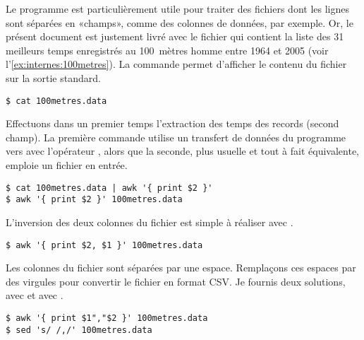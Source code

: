 Le programme  est particulièrement utile pour traiter des
fichiers dont les lignes sont séparées en «champs», comme des colonnes
de données, par exemple. Or, le présent document est justement livré
avec le fichier  qui contient la liste des 31
meilleurs temps enregistrés au 100~mètres homme entre 1964 et 2005
(voir l'\autoref{ex:internes:100metres}). La commande 
permet d'afficher le contenu du fichier sur la sortie standard.
\begin{Schunk}
\begin{Verbatim}
$ cat 100metres.data
\end{Verbatim}
\end{Schunk}

Effectuons dans un premier temps l'extraction des temps des records
(second champ). La première commande utilise un transfert de données
du programme  vers  avec l'opérateur %
\code{\textbar}, alors
que la seconde, plus usuelle et tout à fait équivalente, emploie un
fichier en entrée.
\begin{Schunk}
\begin{Verbatim}
$ cat 100metres.data | awk '{ print $2 }'
$ awk '{ print $2 }' 100metres.data
\end{Verbatim}
\end{Schunk}

L'inversion des deux colonnes du fichier est simple à réaliser avec
.
\begin{Schunk}
\begin{Verbatim}
$ awk '{ print $2, $1 }' 100metres.data
\end{Verbatim}
\end{Schunk}

Les colonnes du fichier  sont séparées par une
espace. Remplaçons ces espaces par des virgules pour convertir le
fichier en format CSV. Je fournis deux solutions, avec  et avec
.
\begin{Schunk}
\begin{Verbatim}
$ awk '{ print $1","$2 }' 100metres.data
$ sed 's/ /,/' 100metres.data
\end{Verbatim}
\end{Schunk}

